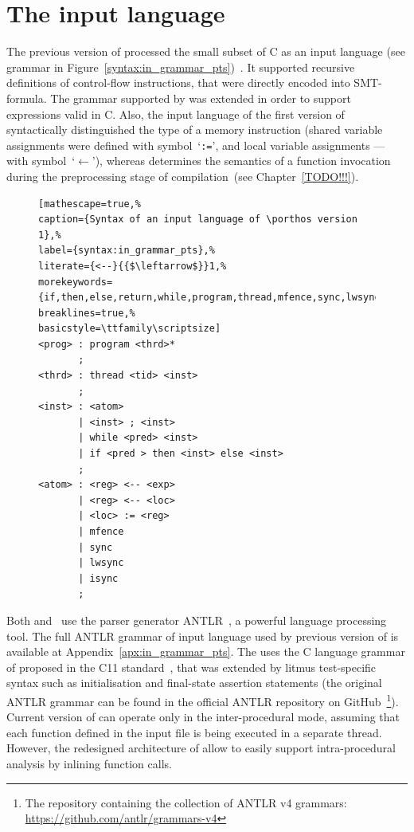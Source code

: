 \section{The input language}
\label{ch:impl:input}


The previous version of \porthos processed the small subset of C as an input language (see grammar in Figure~\ref{syntax:in_grammar_pts})~\cite{Porthos17}.
It supported recursive definitions of control-flow instructions, that were directly encoded into SMT-formula.
The grammar supported by \porthos[2] was extended in order to support expressions valid in C. %
Also, the input language of the first version of \porthos syntactically distinguished the type of a memory instruction (shared variable assignments were defined with symbol~`\texttt{:=}', and local variable assignments --- with symbol~`$\mathtt{\leftarrow}$'), whereas \porthos[2] determines the semantics of a function invocation during the preprocessing stage of compilation~(see Chapter~\ref{TODO!!!}).

\begin{figure}%
\begin{lstlisting}[mathescape=true,%
caption={Syntax of an input language of \porthos version 1},%
label={syntax:in_grammar_pts},%
literate={<--}{{$\leftarrow$}}1,%
morekeywords={if,then,else,return,while,program,thread,mfence,sync,lwsync,isync}%
breaklines=true,%
basicstyle=\ttfamily\scriptsize]
<prog> : program <thrd>*
       ;
<thrd> : thread <tid> <inst>
       ;
<inst> : <atom>
       | <inst> ; <inst>
       | while <pred> <inst>
       | if <pred > then <inst> else <inst>
       ;
<atom> : <reg> <-- <exp>
       | <reg> <-- <loc>
       | <loc> := <reg>
       | mfence
       | sync
       | lwsync
       | isync
       ;
\end{lstlisting}
\end{figure}

Both \porthos and \porthos[2] \ use the parser generator ANTLR~\cite{parr2013definitive}, a powerful language processing tool.
The full ANTLR grammar of input language used by previous version of \porthos is available at Appendix~\ref{apx:in_grammar_pts}.
The \porthos[2] uses the C language grammar of proposed in the C11 standard~\cite{jtc2011sc22}, that was extended by litmus test-specific syntax such as initialisation and final-state assertion statements (the original ANTLR grammar can be found in the official ANTLR repository on GitHub~\footnote{The repository containing the collection of ANTLR v4 grammars:\\ \url{https://github.com/antlr/grammars-v4}}).
Current version of \porthos[2] can operate only in the inter-procedural mode, assuming that each function defined in the input file is being executed in a separate thread.
However, the redesigned architecture of \porthos[2] allow to easily support intra-procedural analysis by inlining function calls.


